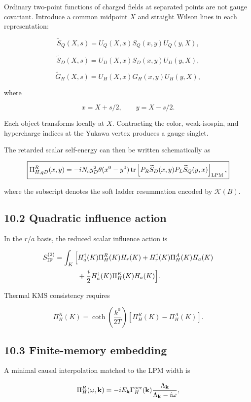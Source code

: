 \documentclass[
  10pt,
]{article}
\begin{document}
Ordinary two-point functions of charged fields at separated points are
not gauge covariant. Introduce a common midpoint \(X\) and straight
Wilson lines in each representation:

\[
\widetilde S_Q(X,s)
=
U_Q(X,x)
S_Q(x,y)
U_Q(y,X),
\]

\[
\widetilde S_D(X,s)
=
U_D(X,x)
S_D(x,y)
U_D(y,X),
\]

\[
\widetilde G_H(X,s)
=
U_H(X,x)
G_H(x,y)
U_H(y,X),
\]

where

\[
x=X+s/2,
\qquad
y=X-s/2.
\]

Each object transforms locally at \(X\). Contracting the color,
weak-isospin, and hypercharge indices at the Yukawa vertex produces a
gauge singlet.

The retarded scalar self-energy can then be written schematically as

\[
\boxed{
\Pi_{H,qD}^{R}(x,y)
=
-iN_cy_D^2\theta(x^0-y^0)
\operatorname{tr}
\left[
P_R\widetilde S_D(x,y)
P_L\widetilde S_Q(y,x)
\right]_{\rm LPM},
}
\]

where the subscript denotes the soft ladder resummation encoded by
\(\mathcal K(B)\).

\subsection{10.2 Quadratic influence
action}\label{quadratic-influence-action}

In the \(r/a\) basis, the reduced scalar influence action is

\[
\begin{aligned}
S_{\rm IF}^{(2)}
=
\int_K\Big[&
H_a^\dagger(K)
\Pi_H^R(K)
H_r(K)
+
H_r^\dagger(K)
\Pi_H^A(K)
H_a(K)
\\
&+
\frac{i}{2}
H_a^\dagger(K)
\Pi_H^K(K)
H_a(K)
\Big].
\end{aligned}
\]

Thermal KMS consistency requires

\[
\boxed{
\Pi_H^K(K)
=
\coth\left(\frac{k^0}{2T}\right)
\left[
\Pi_H^R(K)-\Pi_H^A(K)
\right].
}
\]

\subsection{10.3 Finite-memory embedding}\label{finite-memory-embedding}

A minimal causal interpolation matched to the LPM width is

\[
\Pi_H^R(\omega,{\bf k})
=
-iE_{\bf k}\Gamma_H^{\rm occ}({\bf k})
\frac{\Lambda_{\bf k}}
{\Lambda_{\bf k}-i\omega},
\]
\end{document}
